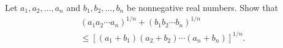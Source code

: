 Let $a_1, a_2, \dots, a_n$  and  $b_1, b_2, \dots, b_n$
be nonnegative real numbers.
Show that
\begin{align*}
& (a_1 a_2 \cdots a_n)^{1/n} + (b_1 b_2 \cdots b_n)^{1/n} \\
&\leq [(a_1+b_1) (a_2+b_2) \cdots (a_n + b_n) ]^{1/n}.
\end{align*}
